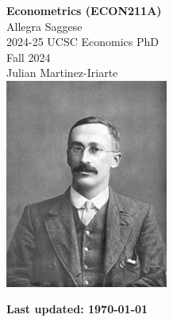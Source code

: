 \documentclass{article}
\begin{document}
\begin{titlepage}
    \centering
    \vspace*{1in} %
    {\LARGE \textbf{Econometrics (ECON211A)}} \\[0.5cm]
    {\LARGE Allegra Saggese} \\ [.5cm] %
    {\large 2024-25 UCSC Economics PhD} \\ [1.5 cm] 
    {\large Fall 2024} \\[.25cm] %
    {\large Julian Martinez-Iriarte} \\[.25cm]
    \includegraphics[width=0.4\textwidth]{William_Sealy_Gosset.jpg} 
    \vfill
    \end{titlepage}

\clearpage
\pagestyle{empty} %
\noindent \textbf{Last updated: \today} 
\vspace{0.5cm} %
\tableofcontents
\clearpage %
\pagestyle{plain} %
\end{document}
